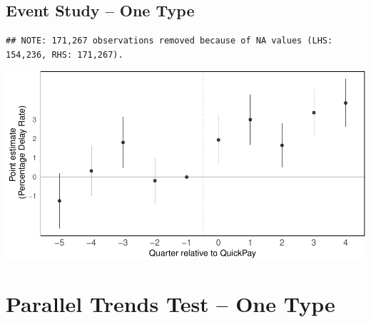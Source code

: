 \documentclass[
]{article}
\begin{document}
\hypertarget{event-study-one-type}{%
\subsection{Event Study -- One Type}\label{event-study-one-type}}

\begin{verbatim}
## NOTE: 171,267 observations removed because of NA values (LHS: 154,236, RHS: 171,267).
\end{verbatim}

\includegraphics{qp_first_pc_delay-2_files/figure-latex/event_study_one_type-1.pdf}

\hypertarget{parallel-trends-test-one-type}{%
\section{Parallel Trends Test -- One
Type}\label{parallel-trends-test-one-type}}
\end{document}
